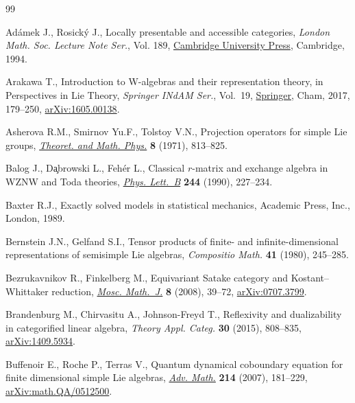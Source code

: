 \documentclass[10pt,a4paper]{article}
\numberwithin{equation}{section}
\begin{document}
\begin{thebibliography}{99}
\footnotesize\itemsep=0pt

Ad\'amek J., Rosick\'y J., Locally presentable and accessible categories,
 \textit{London Math. Soc. Lecture Note Ser.}, Vol. 189, \href{https://doi.org/10.1017/CBO9780511600579}{Cambridge University
 Press}, Cambridge, 1994.

Arakawa T., Introduction to {W}-algebras and their representation theory, in
 Perspectives in {L}ie {T}heory, \textit{Springer INdAM Ser.}, Vol.~19,
 \href{https://doi.org/10.1007/978-3-319-58971-8_4}{Springer}, Cham, 2017, 179--250, \href{https://arxiv.org/abs/1605.00138}{arXiv:1605.00138}.

Asherova R.M., Smirnov Yu.F., Tolstoy V.N., Projection operators for simple
 {L}ie groups, \href{https://doi.org/10.1007/BF01038003}{\textit{Theoret. and Math. Phys.}} \textbf{8} (1971), 813--825.

Balog J., D\c{a}browski L., Feh\'er L., Classical {$r$}-matrix and exchange
 algebra in {WZNW} and {T}oda theories, \href{https://doi.org/10.1016/0370-2693(90)90060-J}{\textit{Phys. Lett.~B}} \textbf{244}
 (1990), 227--234.

Baxter R.J., Exactly solved models in statistical mechanics, Academic Press,
 Inc., London, 1989.

Bernstein J.N., Gelfand S.I., Tensor products of finite- and
 infinite-dimensional representations of semisimple {L}ie algebras,
 \textit{Compositio Math.} \textbf{41} (1980), 245--285.

Bezrukavnikov R., Finkelberg M., Equivariant {S}atake category and
 {K}ostant--{W}hittaker reduction, \href{https://doi.org/10.17323/1609-4514-2008-8-1-39-72}{\textit{Mosc. Math.~J.}} \textbf{8} (2008),
 39--72, \href{https://arxiv.org/abs/0707.3799}{arXiv:0707.3799}.

Brandenburg M., Chirvasitu A., Johnson-Freyd T., Reflexivity and dualizability
 in categorified linear algebra, \textit{Theory Appl. Categ.} \textbf{30}
 (2015), 808--835, \href{https://arxiv.org/abs/1409.5934}{arXiv:1409.5934}.

Buffenoir E., Roche P., Terras V., Quantum dynamical coboundary equation for
 finite dimensional simple {L}ie algebras, \href{https://doi.org/10.1016/j.aim.2007.02.001}{\textit{Adv. Math.}} \textbf{214}
 (2007), 181--229, \href{https://arxiv.org/abs/math.QA/0512500}{arXiv:math.QA/0512500}.


\end{thebibliography}
\end{document}
